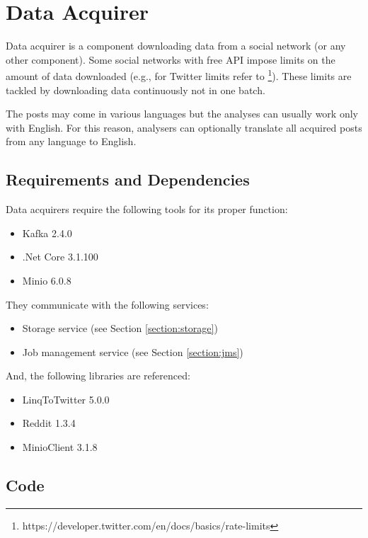 \section{Data Acquirer}\label{section:acquirers}

Data acquirer is a component downloading data from a social network (or any other component). Some social networks with free API impose limits on the amount of data downloaded (e.g., for Twitter limits refer to \footnote{https://developer.twitter.com/en/docs/basics/rate-limits}). These limits are tackled by downloading data continuously not in  one batch. 

The posts may come in various languages but the analyses can usually work only with English. For this reason, analysers can optionally translate all acquired posts from any language to English.

\subsection{Requirements and Dependencies}

\noindent
Data acquirers require the following tools for its proper function:

\begin{itemize}
    \item Kafka 2.4.0
    \item .Net Core 3.1.100
    \item Minio 6.0.8
\end{itemize}

\noindent
They communicate with the following services:
\begin{itemize}
    \item Storage service (see Section \ref{section:storage})
    \item Job management service (see Section \ref{section:jms})
\end{itemize}

\noindent
And, the following libraries are referenced:

\begin{itemize}
    \item LinqToTwitter 5.0.0
    \item Reddit 1.3.4
    \item MinioClient 3.1.8
\end{itemize}

\subsection{Code}

